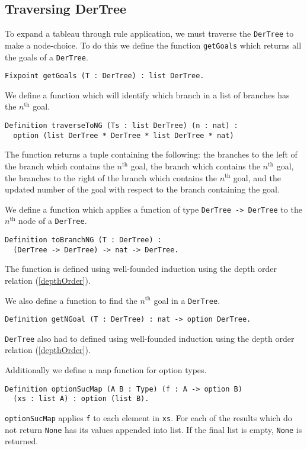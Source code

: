 \documentclass{llncs}
\begin{document}
\subsection{Traversing DerTree}
%
To expand a tableau through rule application, we must traverse the
\verb+DerTree+ to make a node-choice. To do this we define the function
\verb+getGoals+ which returns all the goals of a \verb+DerTree+.
%
\begin{verbatim}
Fixpoint getGoals (T : DerTree) : list DerTree.
\end{verbatim}
%
We define a function which will identify which branch in a list of branches has
the $n^{\textrm{th}}$ goal.
%
\begin{verbatim}
Definition traverseToNG (Ts : list DerTree) (n : nat) :
  option (list DerTree * DerTree * list DerTree * nat)
\end{verbatim}
%
The function returns a tuple containing the following: the branches to the left
of the branch which contains the $n^{\textrm{th}}$ goal, the branch which
contains the $n^{\textrm{th}}$ goal, the branches to the right of the branch
which contains the $n^{\textrm{th}}$ goal, and the updated number of the goal
with respect to the branch containing the goal.

We define a function which applies a function of type
\verb+DerTree -> DerTree+ to the $n^{\textrm{th}}$ node of a \verb+DerTree+.
%
\begin{verbatim}
Definition toBranchNG (T : DerTree) :
  (DerTree -> DerTree) -> nat -> DerTree.
\end{verbatim}
%
The function is defined using well-founded induction using the depth order
relation (\ref{depthOrder}).

We also define a function to find the $n^{\textrm{th}}$ goal in a
\verb+DerTree+.
%
\begin{verbatim}
Definition getNGoal (T : DerTree) : nat -> option DerTree.
\end{verbatim}
%
\verb+DerTree+ also had to defined using well-founded induction using the
depth order relation (\ref{depthOrder}).

Additionally we define a map function for option types.
%
\begin{verbatim}
Definition optionSucMap (A B : Type) (f : A -> option B)
  (xs : list A) : option (list B).
\end{verbatim}
%
\verb+optionSucMap+ applies \verb+f+ to each element in \verb+xs+. For each of
the results which do not return \verb+None+ has its values appended into list.
If the final list is empty, \verb+None+ is returned.
\end{document}
